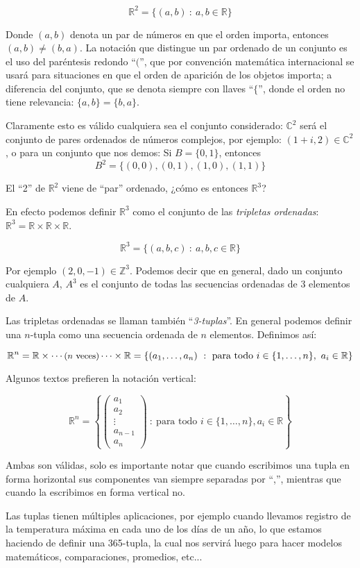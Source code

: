 \documentclass[12pt]{book}
\def\R{\mathbb{R}}
\def\Z{\mathbb{Z}}
\def\C{\mathbb{C}}
\begin{document}
$$\R^2=\{ (a,b)\ :\ a,b\in\R\}$$

Donde $(a,b)$ denota un par de números en que el orden importa, entonces $(a,b)\not=(b,a)$.
La notación que distingue un par ordenado de un conjunto es el uso del paréntesis redondo ``$($'', que por convención matemática internacional se usará para situaciones en que el orden de aparición de los objetos importa; a diferencia del conjunto, que se denota siempre con llaves ``$\{$'', donde el orden no tiene relevancia: $\{a,b\}=\{b,a\}$.

Claramente esto es válido cualquiera sea el conjunto considerado: $\C^2$ será el conjunto de pares ordenados de números complejos, por ejemplo: $(1+i,2)\in\C^2$, o para un conjunto que nos demos: Si $B=\{0,1\}$, entonces
$$B^2=\{(0,0),(0,1),(1,0),(1,1)\}$$

El ``2'' de $\R^2$ viene de ``par'' ordenado, ¿cómo es entonces $\R^3$?

En efecto podemos definir $\R^3$ como el conjunto de las \emph{tripletas ordenadas}: $\R^3=\R\times\R\times \R$.

$$\R^3=\{ (a,b,c)\ :\ a,b,c\in\R\}$$

Por ejemplo $(2,0,-1)\in\Z^3$. Podemos decir que en general, dado un conjunto cualquiera $A$, $A^3$ es el conjunto de todas las secuencias ordenadas de 3 elementos de $A$.

Las tripletas ordenadas se llaman también ``\emph{3-tuplas}''.
En general podemos definir una $n$-tupla como una secuencia ordenada de $n$ elementos.
Definimos así:

$$\R^n=\R\times\cdots \textrm{\small ($n$ veces)}\cdots \times \R=\{ (a_1,\dots,a_n)\ :\ \textrm{para todo}\ i\in\{1,\dots,n\},\ a_i\in \R\}$$

Algunos textos prefieren la notación vertical:

$$\R^n=\left\{\left(\begin{array}{c}a_1\\a_2\\\vdots\\a_{n-1}\\a_n\end{array}\right)\ :\ \textrm{para todo }i\in\{1,\dots,n\}, a_i\in\R\right\}$$

Ambas son válidas, solo es importante notar que cuando escribimos una tupla en forma horizontal sus componentes van siempre separadas por ``,'', mientras que cuando la escribimos en forma vertical no.

Las tuplas tienen múltiples aplicaciones, por ejemplo cuando llevamos registro de la temperatura máxima en cada uno de los días de un año, lo que estamos haciendo de definir una 365-tupla, la cual nos servirá luego para hacer modelos matemáticos, comparaciones, promedios, etc...
\end{document}
